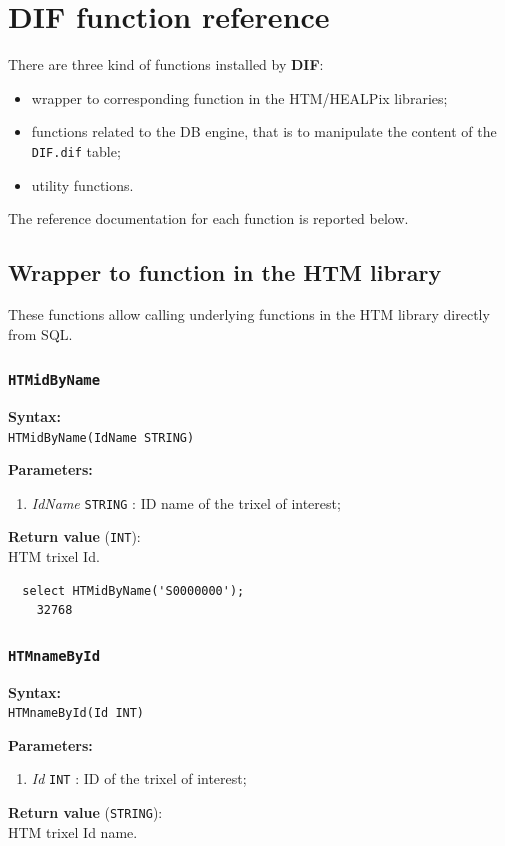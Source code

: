 \documentclass[10pt,titlepage]{article}
\newcommand{\dif}{\textbf{\small DIF}}
\newcommand{\syntax}[1]
{
  \bigskip
  \noindent
  \textbf{Syntax:} \\ 
  \indent \texttt{#1}
}
\newenvironment{parameters}
{
  \medskip
  \noindent
  \textbf{Parameters:}
  \begin{enumerate}
}
{
  \end{enumerate}
}
\newcommand{\param}[2]
{
  \item \textit{#1} \texttt{#2} 
}
\newcommand{\return}[1]
{
  \medskip
  \noindent
  \textbf{Return value} (\texttt{#1}): \\
  \indent
}
\newcommand{\example}
{
\medskip
\noindent{\textbf{Example:}}
}
\begin{document}
\newpage
\section{DIF function reference}
\label{sec:DIF_function_reference}

There are three kind of functions installed by \dif:
\begin{itemize}
\item wrapper to corresponding function in the HTM/HEALPix libraries;
\item functions related to the DB engine, that is to manipulate the
  content of the {\tt DIF.dif} table;
\item utility functions.
\end{itemize}
The reference documentation for each function is reported below.
%
%

\subsection{Wrapper to function in the HTM library}
These functions allow calling underlying functions in the HTM library
directly from SQL.
%

\subsubsection{{\tt HTMidByName}}
\syntax{HTMidByName(IdName STRING)}

\begin{parameters}
  \param{IdName}{STRING}: ID name of the trixel of interest;
\end{parameters}

\return{INT} HTM trixel Id.

\example
%
\begin{verbatim}
  select HTMidByName('S0000000');
    32768
\end{verbatim}
%
%

\subsubsection{{\tt HTMnameById}}
\syntax{HTMnameById(Id INT)}

\begin{parameters}
  \param{Id}{INT}: ID of the trixel of interest;
\end{parameters}

\return{STRING} HTM trixel Id name.
\end{document}
